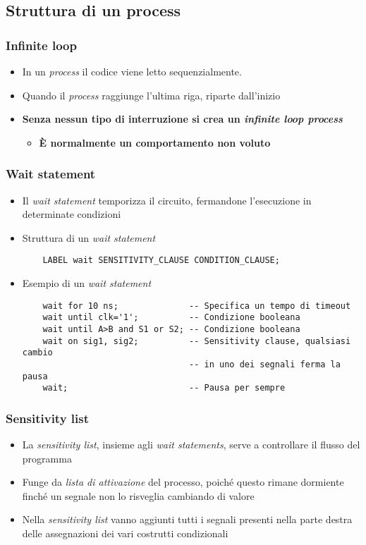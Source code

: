 \documentclass{article}
\begin{document}
\subsection{Struttura di un process}
\subsubsection{Infinite loop}
\begin{itemize}
  \item In un \textit{process} il codice viene letto sequenzialmente.
  \item Quando il \textit{process} raggiunge l'ultima riga, riparte dall'inizio
  \item \textbf{Senza nessun tipo di interruzione si crea un \textit{infinite loop process}}
        \begin{itemize}
          \item \textbf{\`E normalmente un comportamento non voluto}
        \end{itemize}
\end{itemize}
\subsubsection{Wait statement}
\begin{itemize}
  \item Il \textit{wait statement} temporizza il circuito, fermandone l'esecuzione in determinate condizioni
  \item Struttura di un \textit{wait statement}
        \begin{verbatim}
    LABEL wait SENSITIVITY_CLAUSE CONDITION_CLAUSE;
	      \end{verbatim}

        \newpage

  \item Esempio di un \textit{wait statement}
        \begin{verbatim}
    wait for 10 ns;              -- Specifica un tempo di timeout
    wait until clk='1';          -- Condizione booleana
    wait until A>B and S1 or S2; -- Condizione booleana
    wait on sig1, sig2;          -- Sensitivity clause, qualsiasi cambio
                                 -- in uno dei segnali ferma la pausa
    wait;                        -- Pausa per sempre
	      \end{verbatim}
\end{itemize}
\subsubsection{Sensitivity list}
\begin{itemize}
  \item La \textit{sensitivity list}, insieme agli \textit{wait statements}, serve a controllare il flusso del programma
  \item Funge da \textit{lista di attivazione} del processo, poiché questo rimane dormiente finché un segnale non lo risveglia cambiando di valore
  \item Nella \textit{sensitivity list} vanno aggiunti tutti i segnali presenti nella parte destra delle assegnazioni dei vari costrutti condizionali
\end{itemize}
\end{document}
